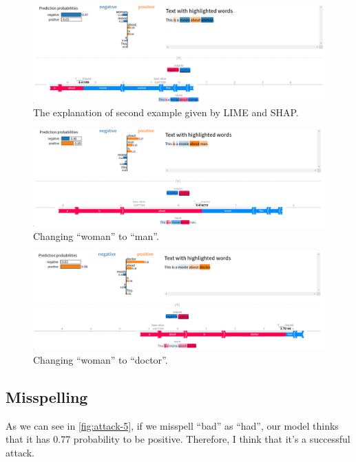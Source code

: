 \documentclass{article}[12pt]
\begin{document}
\begin{figure}[htbp]
	\centering
	\includegraphics[width=\linewidth]{figure/attack-2}
	\caption{The explanation of second example given by LIME and SHAP.}
	\label{fig:attack-2}
\end{figure}

\begin{figure}[htbp]
	\centering
	\includegraphics[width=\linewidth]{figure/attack-3}
	\caption{Changing ``woman'' to ``man''.}
	\label{fig:attack-3}
\end{figure}

\begin{figure}[htbp]
	\centering
	\includegraphics[width=\linewidth]{figure/attack-4}
	\caption{Changing ``woman'' to ``doctor''.}
	\label{fig:attack-4}
\end{figure}


\subsection{Misspelling}

As we can see in \autoref{fig:attack-5}, if we misspell ``bad'' as ``had'', our model thinks that it has 0.77 probability to be positive. Therefore, I think that it's a successful attack.
\end{document}

